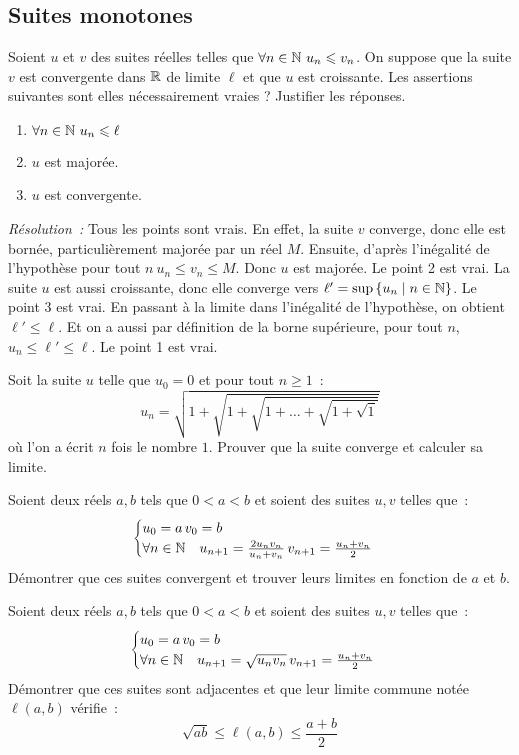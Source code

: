 \subsection{Suites monotones}
\begin{exercice}
    Soient \(u\) et \(v\) des suites réelles telles que \(\forall n \in \mathbb{N} \ u_n \leqslant v_n\). On suppose que la suite \(v\) est convergente dans \(\mathbb{R}\) de limite \(\ell\) et que \(u\) est croissante. Les assertions suivantes sont elles nécessairement vraies ? Justifier les réponses.
    \begin{enumerate}
        \item \(\forall n \in \mathbb{N} \ u_n \leqslant \ell\)
        \item \(u\) est majorée.
        \item \(u\) est convergente.
    \end{enumerate}    
\end{exercice}
\emph{Résolution~:} Tous les points sont vrais. En effet, la suite \(v\) converge, donc elle est bornée, particulièrement majorée par un réel \(M\). Ensuite, d'après l'inégalité de l'hypothèse pour tout \(n \ u_n \leqslant v_n \leqslant M\). Donc \(u\) est majorée. Le point 2 est vrai. La suite \(u\) est aussi croissante, donc elle converge vers \(\ell' = \sup\left\{u_n\mathrel{}\middle|\mathrel{}n\in \mathbb{N}\right\}\). Le point 3 est vrai. En passant à la limite dans l'inégalité de l'hypothèse, on obtient \(\ell' \leqslant \ell\). Et on a aussi par définition de la borne supérieure, pour tout \(n\), \(u_n \leqslant \ell' \leqslant \ell\). Le point 1 est vrai.
\begin{exercice}
    Soit la suite \(u\) telle que \(u_0 = 0\) et pour tout \(n \geqslant 1\)~:
    \[ u_n = \sqrt{1 + \sqrt{ 1 + \sqrt{ 1 + \ldots +\sqrt{1 + \sqrt{1}}}}} \]
    où l'on a écrit \(n\) fois le nombre \(1\). Prouver que la suite converge et calculer sa limite.
\end{exercice}
\begin{exercice}
    Soient deux réels \(a, b\) tels que \(0 < a < b\) et soient des suites \(u, v\) telles que~:
    \[ \begin{cases} u_0 = a \, v_0 = b \\ \forall n \in \mathbb{N} \quad u_{n+1} = \frac{2 u_n v_n}{u_n + v_n} \, v_{n+1} = \frac{u_n+v_n}{2} \end{cases}\]
    Démontrer que ces suites convergent et trouver leurs limites en fonction de \(a\) et \(b\).
\end{exercice}
\begin{exercice}
    Soient deux réels \(a, b\) tels que \(0 < a < b \) et soient des suites \(u, v\) telles que~:
    \[ \begin{cases} u_0 = a \, v_0 = b \\ \forall n \in \mathbb{N} \quad u_{n+1} = \sqrt{u_n v_n} \, v_{n+1} = \frac{u_n+v_n}{2} \end{cases}\]
    Démontrer que ces suites sont adjacentes et que leur limite commune notée \(\ell(a,b)\) vérifie~:
    \[ \sqrt{ab} \leqslant \ell(a,b) \leqslant \frac{a+b}{2}\]
\end{exercice}
